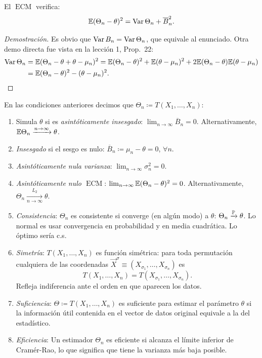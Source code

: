 \begin{proposicion}[1]
El $\operatorname{ECM}$ verifica:
\[
  \mathbb{E}(\Theta_n - \theta)^2 = \operatorname{Var}\Theta_n + \overline{B}_n^2.
\]
\end{proposicion}

\begin{proof}[Demostración]
Es obvio que $\operatorname{Var} B_n = \operatorname{Var}\Theta_n$, que equivale al enunciado. Otra demo directa fue vista en la lección 1, Prop.\ 22:
\textcolor{azulresalt}{\begin{align*}
  \operatorname{Var}\Theta_n &= \mathbb{E}(\Theta_n - \theta + \theta - \mu_n)^2 = \mathbb{E}(\Theta_n - \theta)^2 + \mathbb{E}(\theta - \mu_n)^2 + 2\mathbb{E}(\Theta_n - \theta)\mathbb{E}(\theta - \mu_n) \\
               &= \mathbb{E}(\Theta_n - \theta)^2 - (\theta - \mu_n)^2.
\end{align*}}
\end{proof}
\begin{definicion}
En las condiciones anteriores decimos que $\Theta_n \coloneqq T(X_1, \dots, X_n)$:
\begin{enumerate}
  \item Simula $\theta$ si es \emph{asintóticamente insesgado}: $\lim_{n\to\infty} \overline{B}_n = 0$. Alternativamente, $\mathbb{E}\Theta_n \xrightarrow{n\to\infty} \theta$.
  \item \emph{Insesgado} si el sesgo es nulo: $\overline{B}_n \coloneqq \mu_n - \theta = 0$, $\forall n$.
  \item \emph{Asintóticamente nula varianza}: $\lim_{n\to\infty} \sigma_n^2 = 0$.
  \item \emph{Asintóticamente nulo $\operatorname{ECM}$}: $\lim_{n\to\infty} \mathbb{E}(\Theta_n - \theta)^2 = 0$. Alternativamente, $\Theta_n \xrightarrow[n\to\infty]{L_2} \theta$.
  \item \emph{Consistencia}: $\Theta_n$ es consistente si converge (en algún modo) a $\theta$: $\Theta_n \xrightarrow{\mathbb{P}} \theta$. Lo normal es usar convergencia en probabilidad y en media cuadrática. Lo óptimo sería c.s.
  \item \emph{Simetría}: $T(X_1, \dots, X_n)$ es función simétrica: para toda permutación cualquiera de las coordenadas $\vec{X}^\sigma \equiv (X_{\sigma_1}, \dots, X_{\sigma_n})$ es
        \[
          T(X_1, \dots, X_n) = T(X_{\sigma_1}, \dots, X_{\sigma_n}).
        \]
        Refleja indiferencia ante el orden en que aparecen los datos.
  \item \emph{Suficiencia}: $\Theta \coloneqq T(X_1, \dots, X_n)$ es suficiente para estimar el parámetro $\theta$ si la información útil contenida en el vector de datos original equivale a la del estadístico.
  \item \emph{Eficiencia}: Un estimador $\Theta_n$ es eficiente si alcanza el límite inferior de Cramér-Rao, lo que significa que tiene la varianza más baja posible.
\end{enumerate}
\end{definicion}
